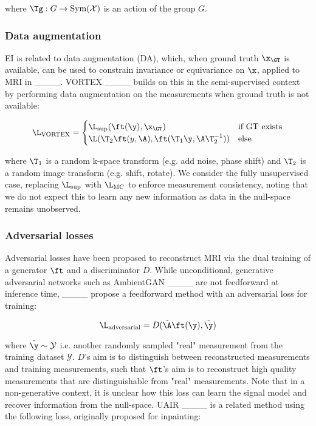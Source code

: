 where $\Tg:G\rightarrow\text{Sym}(\mathcal{X})$ is an action of the group $G$.

\subsubsection{Data augmentation}
EI is related to data augmentation (DA), which, when ground truth $\x_\GT$ is available, can be used to constrain invariance or equivariance on $\x$, applied to MRI in ____. VORTEX ____ builds on this in the semi-supervised context by performing data augmentation on the measurements when ground truth is not available:

\begin{equation}
\L_\text{VORTEX}=
\begin{cases} 
\L_\text{sup}(\ft(\y),\x_\GT) & \text{if GT exists} \\
\L(\T_2\ft(y,\A),\ft(\T_1\y,\A\T_2^{-1})) & \text{else}
\end{cases}
\label{eq:vortex}
\end{equation}

where $\T_1$ is a random k-space transform (e.g. add noise, phase shift) and $\T_2$ is a random image transform (e.g. shift, rotate). We consider the fully unsupervised case, replacing $\L_\text{sup}$ with $\L_\text{MC}$ to enforce measurement consistency, noting that we do not expect this to learn any new information as data in the null-space remains unobserved. 

\subsubsection{Adversarial losses}
Adversarial losses have been proposed to reconstruct MRI via the dual training of a generator $\ft$ and a discriminator $D$. While unconditional, generative adversarial networks such as AmbientGAN ____ are not feedforward at inference time, ____ propose a feedforward method with an adversarial loss for training:

\begin{equation}
    \L_\text{adversarial}=D(\tilde\A\ft(\y),\tilde\y)
    \label{eq:cole}
\end{equation}

where $\tilde\y\sim\mathcal{Y}$ i.e. another randomly sampled "real" measurement from the training dataset $\mathcal{Y}$. $D$'s aim is to distinguish between reconstructed measurements and training measurements, such that $\ft$'s aim is to reconstruct high quality measurements that are distinguishable from "real" measurements. Note that in a non-generative context, it is unclear how this loss can learn the signal model and recover information from the null-space. UAIR ____ is a related method using the following loss, originally proposed for inpainting:


